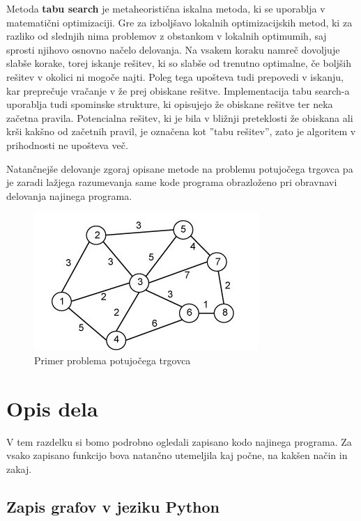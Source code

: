 \documentclass[10pt, a4paper]{article}
\begin{document}
\bigskip
Metoda \textbf{tabu search} je metaheoristična iskalna metoda, ki se uporablja v matematični optimizaciji. Gre za izboljšavo lokalnih optimizacijskih metod, ki za razliko od slednjih nima problemov z obstankom v lokalnih optimumih, saj sprosti njihovo osnovno načelo delovanja. Na vsakem koraku namreč dovoljuje slabše korake, torej iskanje rešitev, ki so slabše od trenutno optimalne, če boljših rešitev v okolici ni mogoče najti. Poleg tega upošteva tudi prepovedi v iskanju, kar preprečuje vračanje v že prej obiskane rešitve. Implementacija tabu search-a uporablja tudi spominske strukture, ki opisujejo že obiskane rešitve ter neka začetna pravila. Potencialna rešitev, ki je bila v bližnji preteklosti že obiskana ali krši kakšno od začetnih pravil, je označena kot ''tabu rešitev'', zato je algoritem v prihodnosti ne upošteva več.

\bigskip
Natančnejše delovanje zgoraj opisane metode na problemu potujočega trgovca pa je zaradi lažjega razumevanja same kode programa obrazloženo pri obravnavi delovanja najinega programa.

\bigskip
\bigskip
\begin{figure}[!h]
\centering
\includegraphics[scale=0.5]{slika1}
\caption{Primer problema potujočega trgovca}
\end{figure}




\section{Opis dela}

V tem razdelku si bomo podrobno ogledali zapisano kodo najinega programa. Za vsako zapisano funkcijo bova natančno utemeljila kaj počne, na kakšen način in zakaj.



\subsection{Zapis grafov v jeziku Python}
\end{document}
